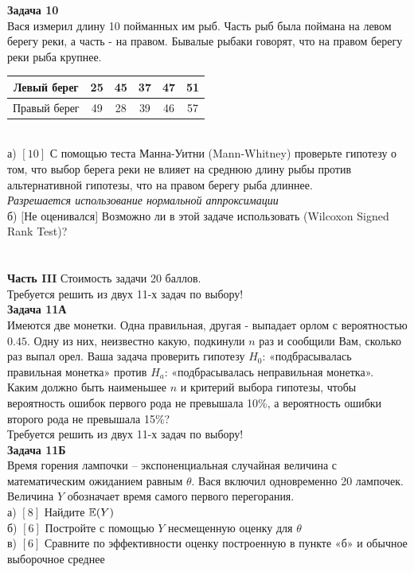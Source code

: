 \documentclass[12pt, a4paper]{article}\usepackage[]{graphicx}\usepackage[]{color}
\begin{document}
\textbf{Задача 10} \\ %
Вася измерил длину 10 пойманных им рыб. Часть рыб была поймана на
левом берегу реки, а часть - на правом. Бывалые рыбаки говорят,
что на правом берегу реки рыба крупнее. \\
\begin{tabular}{|c|c|c|c|c|c|}
  \hline
  Левый берег & 25 & 45 & 37 & 47 & 51   \\
  \hline
  Правый берег & 49 & 28 & 39 & 46 & 57   \\
  \hline
\end{tabular} \\
а) $[10]$ С помощью теста Манна-Уитни (Mann-Whitney) проверьте
гипотезу о том, что выбор берега реки не влияет на среднюю длину
рыбы против
альтернативной гипотезы, что на правом берегу рыба длиннее. \\
\emph{Разрешается использование нормальной аппроксимации} \\
б) $[$Не оценивался$]$ Возможно ли в этой задаче использовать
(Wilcoxon Signed Rank
Test)? \\ \\ \\


\textbf{Часть III} Стоимость задачи 20 баллов. \\

Требуется решить \textbf{} из двух 11-х задач по
выбору! \\


\textbf{Задача 11А} \\
Имеются две монетки. Одна правильная, другая - выпадает орлом с
вероятностью $0.45$. Одну из них, неизвестно какую, подкинули $n$
раз и сообщили Вам, сколько раз выпал орел. Ваша задача проверить
гипотезу $H_{0}$: «подбрасывалась правильная монетка» против
$H_{a}$:
«подбрасывалась неправильная монетка». \\
Каким должно быть наименьшее $n$ и критерий выбора гипотезы, чтобы
вероятность ошибок первого рода не превышала 10\%, а вероятность
ошибки второго рода не превышала 15\%? \\

Требуется решить \textbf{} из двух 11-х задач по
выбору! \\

\textbf{Задача 11Б} \\
Время горения лампочки – экспоненциальная случайная величина с
математическим ожиданием равным $\theta $. Вася включил
одновременно 20 лампочек. Величина  $Y$ обозначает время самого
первого перегорания. \\
а) $[8]$ Найдите $\mathbb{E}(Y)$ \\
б) $[6]$ Постройте с помощью  $Y$ несмещенную оценку для  $\theta$ \\
в) $[6]$ Сравните по эффективности оценку построенную в пункте
«б» и
обычное выборочное среднее \\
\end{document}
